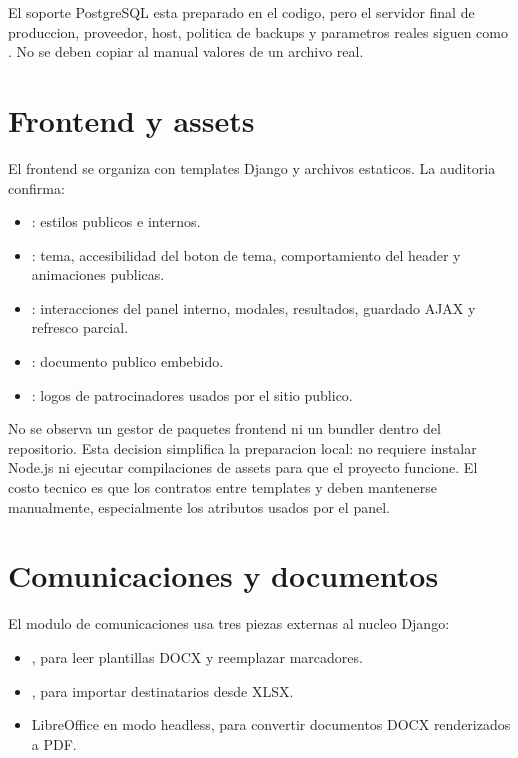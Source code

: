 \begin{advertencia}
El soporte PostgreSQL esta preparado en el codigo, pero el servidor final de produccion, proveedor, host, politica de backups y parametros reales siguen como \MarcadorProduccionPendiente. No se deben copiar al manual valores de un archivo  real.
\end{advertencia}

\section{Frontend y assets}
\label{sec:tecnologias-frontend-assets}

El frontend se organiza con templates Django y archivos estaticos. La auditoria confirma:

\begin{itemize}
  \item {}: estilos publicos e internos.
  \item {}: tema, accesibilidad del boton de tema, comportamiento del header y animaciones publicas.
  \item {}: interacciones del panel interno, modales, resultados, guardado AJAX y refresco parcial.
  \item {}: documento publico embebido.
  \item {}: logos de patrocinadores usados por el sitio publico.
\end{itemize}

No se observa un gestor de paquetes frontend ni un bundler dentro del repositorio. Esta decision simplifica la preparacion local: no requiere instalar Node.js ni ejecutar compilaciones de assets para que el proyecto funcione. El costo tecnico es que los contratos entre templates y  deben mantenerse manualmente, especialmente los atributos  usados por el panel.

\section{Comunicaciones y documentos}
\label{sec:tecnologias-comunicaciones}

El modulo de comunicaciones usa tres piezas externas al nucleo Django:

\begin{itemize}
  \item {}, para leer plantillas DOCX y reemplazar marcadores.
  \item {}, para importar destinatarios desde XLSX.
  \item LibreOffice en modo headless, para convertir documentos DOCX renderizados a PDF.
\end{itemize}

